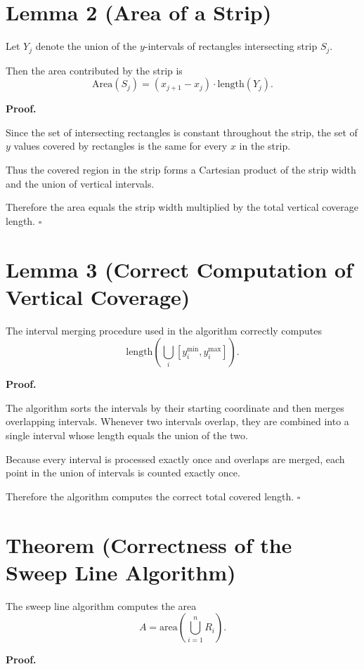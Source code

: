 \documentclass{article}
\begin{document}
\section*{Lemma 2 (Area of a Strip)}

Let $Y_j$ denote the union of the $y$-intervals of rectangles intersecting strip $S_j$.

Then the area contributed by the strip is
\[
\text{Area}(S_j) = (x_{j+1} - x_j)\cdot \text{length}(Y_j).
\]

\textbf{Proof.}

Since the set of intersecting rectangles is constant throughout the strip, the set of $y$ values covered by rectangles is the same for every $x$ in the strip.

Thus the covered region in the strip forms a Cartesian product of the strip width and the union of vertical intervals.

Therefore the area equals the strip width multiplied by the total vertical coverage length.  
\hfill $\square$

\section*{Lemma 3 (Correct Computation of Vertical Coverage)}

The interval merging procedure used in the algorithm correctly computes
\[
\text{length}\left(\bigcup_{i} [y_i^{\min}, y_i^{\max}]\right).
\]

\textbf{Proof.}

The algorithm sorts the intervals by their starting coordinate and then merges overlapping intervals.  
Whenever two intervals overlap, they are combined into a single interval whose length equals the union of the two.

Because every interval is processed exactly once and overlaps are merged, each point in the union of intervals is counted exactly once.

Therefore the algorithm computes the correct total covered length.  
\hfill $\square$

\section*{Theorem (Correctness of the Sweep Line Algorithm)}

The sweep line algorithm computes the area
\[
A = \text{area}\left(\bigcup_{i=1}^{n} R_i\right).
\]

\textbf{Proof.}
\end{document}
